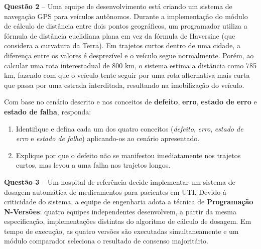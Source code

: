 \documentclass[12pt,a4paper]{article}
\newcommand{\resposta}[1]{
\noindent
\framebox[\textwidth]{
\begin{minipage}{0.98\textwidth}
\vspace*{#1}\null
\end{minipage}
}
}
\begin{document}
\textbf{Questão 2} -- Uma equipe de desenvolvimento está criando um sistema de navegação GPS para veículos autônomos. Durante a implementação do módulo de cálculo de distância entre dois pontos geográficos, um programador utiliza a fórmula de distância euclidiana plana em vez da fórmula de Haversine (que considera a curvatura da Terra). Em trajetos curtos dentro de uma cidade, a diferença entre os valores é desprezível e o veículo segue normalmente. Porém, ao calcular uma rota interestadual de 800 km, o sistema estima a distância como 785 km, fazendo com que o veículo tente seguir por uma rota alternativa mais curta que passa por uma estrada interditada, resultando na imobilização do veículo.

\vspace{0.2cm}

Com base no cenário descrito e nos conceitos de \textbf{defeito}, \textbf{erro}, \textbf{estado de erro} e \textbf{estado de falha}, responda:

\begin{enumerate}[label=\textbf{\alph*)}]
    \item Identifique e defina cada um dos quatro conceitos (\textit{defeito}, \textit{erro}, \textit{estado de erro} e \textit{estado de falha}) aplicando-os ao cenário apresentado.
    \item Explique por que o defeito não se manifestou imediatamente nos trajetos curtos, mas levou a uma falha nos trajetos longos.
\end{enumerate}

\vspace{0.2cm}
\resposta{7cm}

\vspace{0.5cm}

\textbf{Questão 3} -- Um hospital de referência decide implementar um sistema de dosagem automática de medicamentos para pacientes em UTI. Devido à criticidade do sistema, a equipe de engenharia adota a técnica de \textbf{Programação N-Versões}: quatro equipes independentes desenvolvem, a partir da mesma especificação, implementações distintas do algoritmo de cálculo de dosagem. Em tempo de execução, as quatro versões são executadas simultaneamente e um módulo comparador seleciona o resultado de consenso majoritário.
\end{document}
